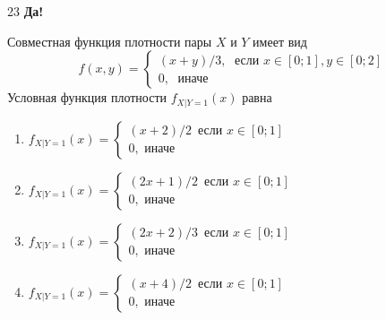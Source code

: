 \documentclass[t]{beamer}
\begin{document}
 \begin{frame} \label{23-Yes} 
\begin{block}{23  \textbf{Да!} 
		\hyperlink{24}{}} 

Совместная функция плотности пары $X$ и $Y$ имеет вид
\[
f(x,y)=\begin{cases}
(x+y)/3, \; \text{ если } x\in[0;1], y\in [0;2] \\
0, \; \text{ иначе}
\end{cases}
\]
Условная функция плотности  $f_{X|Y=1}(x)$ равна
 


 \end{block} 
\begin{enumerate} 
\item[] \hyperlink{23-No}{\beamergotobutton{} $f_{X|Y=1}(x)=\begin{cases} (x+2)/2\, \text{ если } x\in [0;1] \\ 0, \text{ иначе }    \end{cases}$}
\item[] \hyperlink{23-No}{\beamergotobutton{} $f_{X|Y=1}(x)=\begin{cases} (2x+1)/2\, \text{ если } x\in [0;1] \\ 0, \text{ иначе }    \end{cases}$}
\item[] \hyperlink{23-Yes}{\beamergotobutton{} $f_{X|Y=1}(x)=\begin{cases} (2x+2)/3\, \text{ если } x\in [0;1] \\ 0, \text{ иначе }    \end{cases}$}
\item[] \hyperlink{23-No}{\beamergotobutton{} $f_{X|Y=1}(x)=\begin{cases} (x+4)/2\, \text{ если } x\in [0;1] \\ 0, \text{ иначе }    \end{cases}$}
\end{enumerate} 

\end{frame} 
\end{document}
